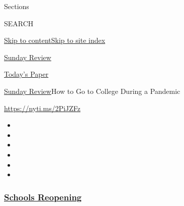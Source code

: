 Sections

SEARCH

\protect\hyperlink{site-content}{Skip to
content}\protect\hyperlink{site-index}{Skip to site index}

\href{https://www.nytimes3xbfgragh.onion/section/opinion/sunday}{Sunday
Review}

\href{https://myaccount.nytimes3xbfgragh.onion/auth/login?response_type=cookie\&client_id=vi}{}

\href{https://www.nytimes3xbfgragh.onion/section/todayspaper}{Today's
Paper}

\href{/section/opinion/sunday}{Sunday Review}\textbar{}How to Go to
College During a Pandemic

\url{https://nyti.ms/2PiJZFz}

\begin{itemize}
\item
\item
\item
\item
\item
\item
\end{itemize}

\hypertarget{schools-reopening}{%
\subsubsection{\texorpdfstring{\href{https://www.nytimes3xbfgragh.onion/spotlight/schools-reopening?name=styln-coronavirus-schools-reopening\&region=TOP_BANNER\&variant=undefined\&block=storyline_menu_recirc\&action=click\&pgtype=Article\&impression_id=2afbc500-e385-11ea-9f87-27c642fe12b3}{Schools
Reopening}}{Schools Reopening}}\label{schools-reopening}}

